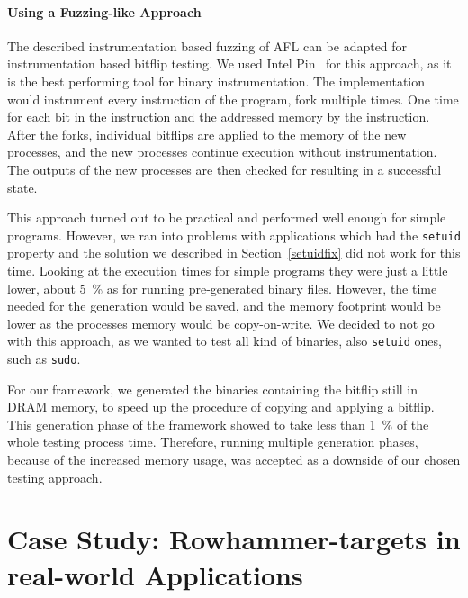 \subsubsection{Using a Fuzzing-like Approach}

The described instrumentation based fuzzing of AFL can be adapted for
instrumentation based bitflip testing. We used Intel Pin~\cite{pintool} for this
approach, as it is the best performing tool for binary instrumentation. The
implementation would instrument every instruction of the program, fork multiple
times. One time for each bit in the instruction and the addressed memory by the
instruction. After the forks, individual bitflips are applied to the memory of
the new processes, and the new processes continue execution without
instrumentation. The outputs of the new processes are then checked for resulting
in a successful state.

This approach turned out to be practical and performed well enough for simple
programs. However, we ran into problems with applications which had the
\texttt{setuid} property and the solution we described in
Section~\ref{setuidfix} did not work for this time. Looking at the execution
times for simple programs they were just a little lower, about \SI{5}{\percent}
as for running pre-generated binary files. However, the time needed for the
generation would be saved, and the memory footprint would be lower as the
processes memory would be copy-on-write. We decided to not go with this
approach, as we wanted to test all kind of binaries, also \texttt{setuid} ones,
such as \texttt{sudo}.

For our framework, we generated the binaries containing the bitflip still in
DRAM memory, to speed up the procedure of copying and applying a bitflip. This
generation phase of the framework showed to take less than \SI{1}{\percent} of
the whole testing process time. Therefore, running multiple generation phases,
because of the increased memory usage, was accepted as a downside of our chosen
testing approach.


\chapter{Case Study: Rowhammer-targets in real-world Applications}
\label{sec:results}

